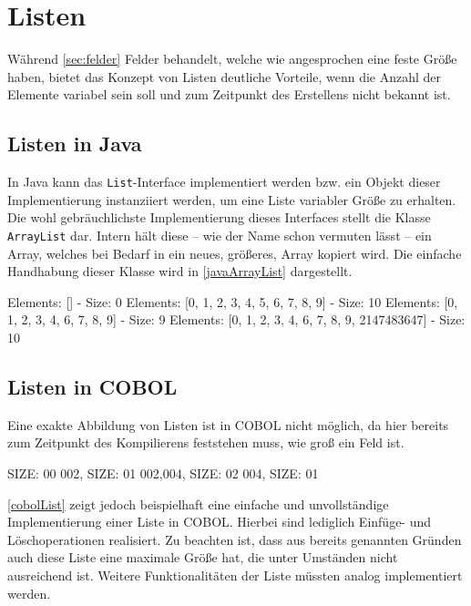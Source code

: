 \section{Listen}
Während \autoref{sec:felder} Felder behandelt, welche wie angesprochen eine feste Größe haben, bietet das Konzept von Listen deutliche Vorteile, wenn die Anzahl der Elemente variabel sein soll und zum Zeitpunkt des Erstellens nicht bekannt ist.

\subsection*{Listen in Java}
In Java kann das \texttt{List}-Interface implementiert werden bzw. ein Objekt dieser Implementierung instanziiert werden, um eine Liste variabler Größe zu erhalten. Die wohl gebräuchlichste Implementierung dieses Interfaces stellt die Klasse \texttt{ArrayList} dar. Intern hält diese -- wie der Name schon vermuten lässt -- ein Array, welches bei Bedarf in ein neues, größeres, Array kopiert wird. Die einfache Handhabung dieser Klasse wird in  \autoref{javaArrayList} dargestellt.

\begin{shellwindow}
Elements: [] - Size: 0
Elements: [0, 1, 2, 3, 4, 5, 6, 7, 8, 9] - Size: 10
Elements: [0, 1, 2, 3, 4, 6, 7, 8, 9] - Size: 9
Elements: [0, 1, 2, 3, 4, 6, 7, 8, 9, 2147483647] - Size: 10
\end{shellwindow}

\subsection*{Listen in COBOL}
Eine exakte Abbildung von Listen ist in COBOL nicht möglich, da hier bereits zum Zeitpunkt des Kompilierens feststehen muss, wie groß ein Feld ist.

\begin{shellwindow}
 SIZE: 00
002, SIZE: 01
002,004, SIZE: 02
004, SIZE: 01
\end{shellwindow}

\autoref{cobolList} zeigt jedoch beispielhaft eine einfache und unvollständige Implementierung einer Liste in COBOL. Hierbei sind lediglich Einfüge- und Löschoperationen realisiert. Zu beachten ist, dass aus bereits genannten Gründen auch diese Liste eine maximale Größe hat, die unter Umständen nicht ausreichend ist. Weitere Funktionalitäten der Liste müssten analog implementiert werden.